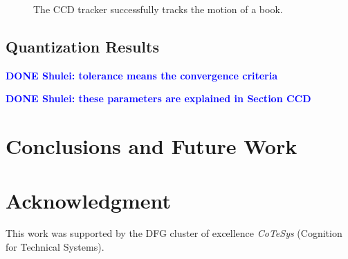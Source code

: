 \documentclass[conference]{IEEEtran}
\newcommand{\dones}[1]{\textbf{\textcolor{blue}{DONE Shulei: #1}}}
\begin{document}
\begin{figure}[htbp]
\begin{minipage}[t]{0.49\linewidth}
  \end{minipage} 
  \begin{minipage}[t]{0.49\linewidth} 
    \centering 
  \end{minipage} 
  \caption[The tracking result based on SIFT contour initialization]{The
    CCD tracker successfully tracks the motion of a book.
  }
  \label{fig:sifttracker}
\end{figure}

\subsection{Quantization Results }
\label{sec:qantization}
\begin{table}[htbp]
\label{tab:qr}
\centering
{}
\caption{Quantization Results}
\end{table}
\dones{tolerance means the convergence criteria}

\begin{table}[htbp]
\label{tab:ip}
\centering
{}
\caption{initialization parameters}
\end{table}
\dones{these parameters are explained in Section CCD}



\section{Conclusions and Future Work}
\label{sec:conclusions}
\section*{Acknowledgment}
 This work was supported by the DFG cluster of excellence \emph{CoTeSys} (Cognition for Technical Systems).


\end{document}
